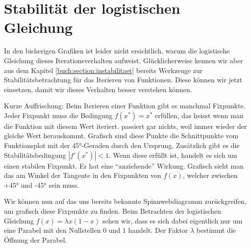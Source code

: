 %
%
%
\section{Stabilität der logistischen Gleichung
\label{logistic:section:stabil}}

In den bisherigen Grafiken ist leider nicht ersichtlich, 
warum die logistische Gleichung dieses Iterationsverhalten aufweist. 
Glücklicherweise kennen wir aber aus dem Kapitel 
\ref{buch:section:instabilitaet}
bereits Werkzeuge zur Stabilitätsbetrachtung für
das Iterieren von Funktionen. 
Diese können wir jetzt einsetzen, damit wir dieses
Verhalten besser verstehen können. 

Kurze Auffrischung: Beim Iterieren einer Funktion
gibt es manchmal Fixpunkte. 
Jeder Fixpunkt muss die Bedingung
$f(x^*)=x^*$ erfüllen, das heisst wenn man die Funktion
mit diesem Wert iteriert. passiert gar nichts, weil
immer wieder der gleiche Wert herauskommt. 
Grafisch sind diese Punkte die Schnittpunkte
vom Funktionsplot mit der 45°-Geraden durch den Ursprung.  
Zusätzlich gibt es die Stabilitätsbedingung 
$|f'(x^*)| < 1$. 
Wenn diese erfüllt ist, handelt es sich um einen
stabilen Fixpunkt. 
Er hat eine ``anziehende'' Wirkung. 
Grafisch sieht man das am Winkel der Tangente in den
Fixpunkten von $f(x)$, welcher zwischen +45° und -45° sein muss.

Wir können nun auf das uns bereits bekannte Spinnwebdiagramm
zurückgreifen, um grafisch diese Fixpunkte zu finden.
Beim Betrachten der logistischen Gleichung 
$f(x) = \lambda x (1-x)$ sehen wir, 
dass es sich dabei eigentlich nur um eine Parabel mit 
den Nullstellen $0$ und $1$ handelt. 
Der Faktor $\lambda$ bestimmt die Öffnung der Parabel.  


